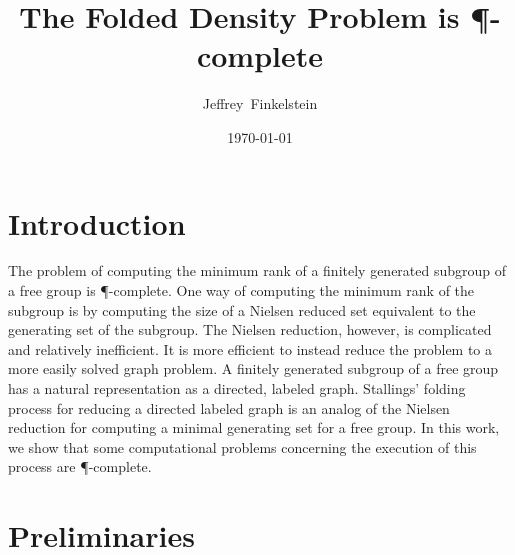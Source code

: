 \documentclass{article}
\author{Jef{}frey~Finkelstein}
\title{The Folded Density Problem is \P-complete}
\date{\today}
\begin{document}
\maketitle

\abstract{}

\section{Introduction}

The problem of computing the minimum rank of a finitely generated subgroup of a free group is \P-complete.
One way of computing the minimum rank of the subgroup is by computing the size of a Nielsen reduced set equivalent to the generating set of the subgroup.
The Nielsen reduction, however, is complicated and relatively inefficient.
It is more efficient to instead reduce the problem to a more easily solved graph problem.
A finitely generated subgroup of a free group has a natural representation as a directed, labeled graph.
Stallings' folding process \cite[Algorithm~5.4]{stallings83} for reducing a directed labeled graph is an analog of the Nielsen reduction for computing a minimal generating set for a free group.
In this work, we show that some computational problems concerning the execution of this process are \P-complete.

\section{Preliminaries}
\end{document}
